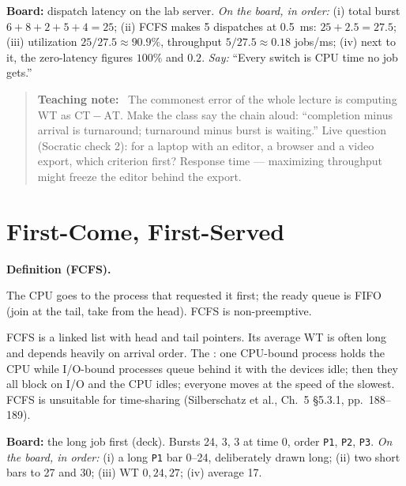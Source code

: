 \documentclass[11pt]{article}
\newenvironment{definitionbox}[1]{%
  \par\noindent\textbf{Definition (#1).}\ \itshape
}{\par\vspace{0.3em}}
\newenvironment{teachingaside}{\begin{quote}\small\color{primary-gold}\textbf{Teaching note:}\ }{\end{quote}}
\begin{document}
\textbf{Board:} dispatch latency on the lab server. \emph{On the board, in order:} (i) total burst $6+8+2+5+4 = 25$; (ii) FCFS makes 5 dispatches at 0.5~ms: $25 + 2.5 = 27.5$; (iii) utilization $25/27.5 \approx 90.9\%$, throughput $5/27.5 \approx 0.18$ jobs/ms; (iv) next to it, the zero-latency figures $100\%$ and $0.2$. \emph{Say:} ``Every switch is CPU time no job gets.''

\begin{teachingaside}
The commonest error of the whole lecture is computing WT as $\mathrm{CT} - \mathrm{AT}$. Make the class say the chain aloud: ``completion minus arrival is turnaround; turnaround minus burst is waiting.'' Live question (Socratic check 2): for a laptop with an editor, a browser and a video export, which criterion first? Response time --- maximizing throughput might freeze the editor behind the export.
\end{teachingaside}

\section{First-Come, First-Served}

\begin{definitionbox}{FCFS}
The CPU goes to the process that requested it first; the ready queue is FIFO (join at the tail, take from the head). FCFS is non-preemptive.
\end{definitionbox}

FCFS is a linked list with head and tail pointers. Its average WT is often long and depends heavily on arrival order. The : one CPU-bound process holds the CPU while I/O-bound processes queue behind it with the devices idle; then they all block on I/O and the CPU idles; everyone moves at the speed of the slowest. FCFS is unsuitable for time-sharing (Silberschatz et al., Ch.~5 \S5.3.1, pp.~188--189).

\textbf{Board:} the long job first (deck). Bursts 24, 3, 3 at time 0, order \texttt{P1}, \texttt{P2}, \texttt{P3}. \emph{On the board, in order:} (i) a long \texttt{P1} bar 0--24, deliberately drawn long; (ii) two short bars to 27 and 30; (iii) WT $0, 24, 27$; (iv) average 17.

\begin{center}
\end{center}
\end{document}

